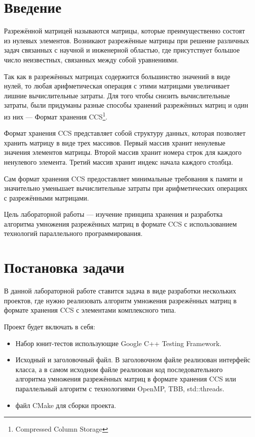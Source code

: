 \documentclass[14pt,a4paper,report]{ncc}
\begin{document}
	\section*{Введение}
	
	Разрежённой матрицей называются матрицы, которые преимущественно состоят из нулевых элементов. Возникают разрежённые матрицы при решение различных задач связанных с научной и инженерной областью, где присутствует большое число неизвестных, связанных между собой уравнениями.
	\par Так как в разрежённых матрицах содержится большинство значений в виде нулей, то любая арифметическая операция с этими матрицами увеличивает лишние вычислительные затраты. Для того чтобы снизить вычислительные затраты, были придуманы разные способы хранений разрежённых матриц и один из них --- Формат хранения CCS\footnote{Compressed Column Storage}. 
	\par Формат хранения CCS представляет собой структуру данных, которая позволяет хранить матрицу в виде трех массивов. Первый массив хранит ненулевые значения элементов матрицы. Второй массив хранит номера строк для каждого ненулевого элемента. Третий массив хранит индекс начала каждого столбца.
	\par Сам формат хранения CCS предоставляет минимальные требования к памяти и значительно уменьшает вычислительные затраты при арифметических операциях с разрежёнными матрицами.
	\par Цель лабораторной работы --- изучение принципа хранения и разработка алгоритма умножения разрежённых матриц в формате CCS с использованием технологий параллельного программирования.
	\newpage
	
	\section*{Постановка задачи}
	В данной лабораторной работе ставится задача в виде разработки нескольких проектов, где нужно реализовать алгоритм умножения разрежённых матриц в формате хранения CCS с элементами комплексного типа.
	\par Проект будет включать в себя:
	\begin{itemize}
		\item Набор юнит-тестов использующие Google C++ Testing Framework.
		\item Исходный и заголовочный файл. В заголовочном файле реализован интерфейс класса, а в самом исходном файле реализован код последовательного алгоритма умножения разрежённых матриц в формате хранения CCS или параллельный алгоритм с технологиями OpenMP, TBB, std::threads.
		\item файл CMake для сборки проекта.
	\end{itemize}
	\newpage
	
\end{document}

